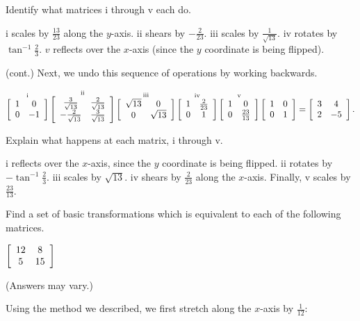 \documentclass[../key.tex]{subfiles}
\begin{document}
\begin{inner_problem}[start=1]
\item Identify what matrices i through v each do.
\end{inner_problem}

i scales by $\frac{13}{23}$ along the $y$-axis. ii shears by $-\frac{2}{23}$. iii scales by $\frac{1}{\sqrt{13}}$. iv rotates by $\tan^{-1} \frac{2}{3}$. $v$ reflects over the $x$-axis (since the $y$ coordinate is being flipped).

\begin {outer_problem} %
\setcounter{outer_problemi}{\value{problem_i}}
\item (cont.) Next, we undo this sequence of operations by working backwards.
\end {outer_problem}

\vspace{-2ex}
$$\mathop{\left[\begin{array}{cc} 1 & 0 \\ 0 & -1 \end{array}\right]}^{\text{i}}
\mathop{\left[\begin{array}{cc} \frac{3}{\sqrt{13}} & \frac{2}{\sqrt{13}} \\ -\frac{2}{\sqrt{13}} & \frac{3}{\sqrt{13}} \end{array}\right]}^{\text{ii}}
\mathop{\left[\begin{array}{cc} \sqrt{13} & 0 \\ 0 & \sqrt{13} \end{array}\right]}^{\text{iii}}
\mathop{\left[\begin{array}{cc} 1 & \frac{2}{23} \\ 0 & 1 \end{array}\right]}^{\text{iv}}
\mathop{\left[\begin{array}{cc} 1 & 0 \\ 0 & \frac{23}{13} \end{array}\right]}^{\text{v}}
\left[\begin{array}{cc} 1 & 0 \\ 0 & 1 \end{array}\right]=\left[\begin{array}{cc} 3 & 4 \\ 2 & -5 \end{array}\right].$$

\begin{inner_problem}
\item Explain what happens at each matrix, i through v.
\end{inner_problem}

i reflects over the $x$-axis, since the $y$ coordinate is being flipped. ii rotates by $-\tan^{-1} \frac{2}{3}$. iii scales by $\sqrt{13}$. iv shears by $\frac{2}{23}$ along the $x$-axis. Finally, v scales by $\frac{23}{13}$.

\begin{outer_problem}
\item Find a set of basic transformations which is equivalent to each of the following matrices.\label{prob:basic_transformations}
\end{outer_problem}

\begin{inner_problem}[start=1]
\item $\left[\begin{array}{cc} 12 & 8 \\ 5 & 15 \end{array}\right]$
\end{inner_problem}

(Answers may vary.)

Using the method we described, we first stretch along the $x$-axis by $\frac{1}{12}$:
\end{document}

